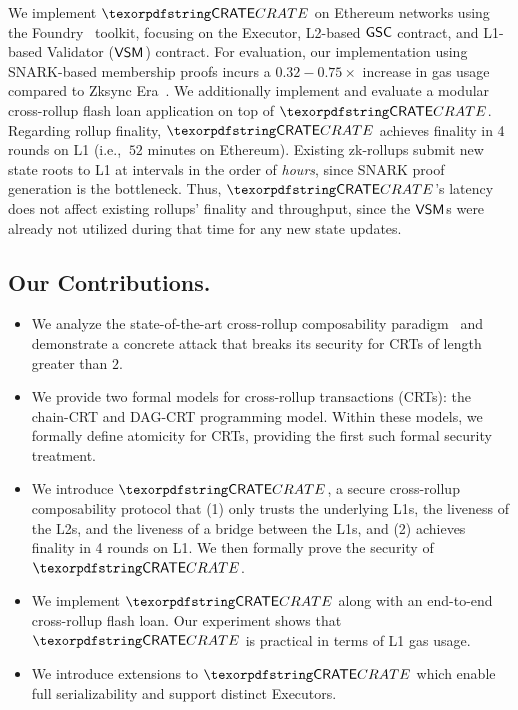 We implement $\pname$ on Ethereum networks using the Foundry~\cite{foundry-book} toolkit, focusing on the Executor, L2-based $\mathsf{GSC}$ contract, and L1-based Validator ($\mathsf{VSM}_{}$) contract. For evaluation, our implementation using SNARK-based membership proofs incurs a $0.32-0.75\times$ increase in gas usage compared to Zksync Era~\cite{zksync-era}. We additionally implement and evaluate a modular cross-rollup flash loan application on top of $\pname$.
Regarding rollup finality, $\pname$ achieves finality in 4 rounds on L1 (i.e., $~52$ minutes on Ethereum). Existing zk-rollups submit new state roots to L1 at intervals in the order of \emph{hours}, since SNARK proof generation is the bottleneck. Thus, $\pname$'s latency does not affect existing rollups' finality and throughput, since the $\mathsf{VSM}_{}$s were already not utilized during that time for any new state updates.




\subsection*{Our Contributions.}
\begin{itemize}[leftmargin=*]
    \item We analyze the state-of-the-art cross-rollup composability paradigm~\cite{shared-val-seq-23} and demonstrate a concrete attack that breaks its security for CRTs of length greater than $2$. 
    \item We provide two formal models for cross-rollup transactions (CRTs): the chain-CRT and DAG-CRT programming model. Within these models, we formally define atomicity for CRTs, providing the first such formal security treatment.
    \item We introduce $\pname$, a secure cross-rollup composability protocol that (1) only trusts the underlying L1s, the liveness of the L2s, and the liveness of a bridge between the L1s, and (2) achieves finality in 4 rounds on L1. We then formally prove the security of $\pname$.
    \item We implement $\pname$ along with an end-to-end cross-rollup flash loan. Our experiment shows that $\pname$ is practical in terms of L1 gas usage.
    \item We introduce extensions to $\pname$ which enable full serializability and support distinct Executors.
\end{itemize}

